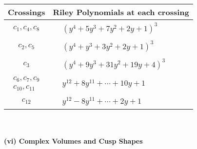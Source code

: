 \documentclass[1p]{elsarticle_modified}
\theoremstyle{definition}
\begin{document}
\begin{tabular}{m{50pt}|m{274pt}}
Crossings & \hspace{64pt}Riley Polynomials at each crossing \\
\hline $$\begin{aligned}c_{1},c_{4},c_{8}\end{aligned}$$&$\begin{aligned}
&(y^4+5 y^3+7 y^2+2 y+1)^3
\end{aligned}$\\
\hline $$\begin{aligned}c_{2},c_{5}\end{aligned}$$&$\begin{aligned}
&(y^4+y^3+3 y^2+2 y+1)^3
\end{aligned}$\\
\hline $$\begin{aligned}c_{3}\end{aligned}$$&$\begin{aligned}
&(y^4+9 y^3+31 y^2+19 y+4)^3
\end{aligned}$\\
\hline $$\begin{aligned}c_{6},c_{7},c_{9}\\c_{10},c_{11}\end{aligned}$$&$\begin{aligned}
&y^{12}+8 y^{11}+\cdots+10 y+1
\end{aligned}$\\
\hline $$\begin{aligned}c_{12}\end{aligned}$$&$\begin{aligned}
&y^{12}-8 y^{11}+\cdots+2 y+1
\end{aligned}$\\
\hline
\end{tabular}\\~\\
\newpage\flushleft \textbf{(vi) Complex Volumes and Cusp Shapes}
\end{document}
